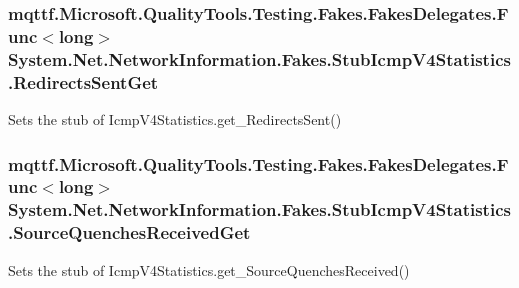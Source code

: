 \hypertarget{class_system_1_1_net_1_1_network_information_1_1_fakes_1_1_stub_icmp_v4_statistics_a3f2e2d6fbc433ec25dd63fc625761414}{
\subsubsection[{Redirects\-Sent\-Get}]{\setlength{\rightskip}{0pt plus 5cm}mqttf.\-Microsoft.\-Quality\-Tools.\-Testing.\-Fakes.\-Fakes\-Delegates.\-Func$<$long$>$ System.\-Net.\-Network\-Information.\-Fakes.\-Stub\-Icmp\-V4\-Statistics.\-Redirects\-Sent\-Get}}\label{class_system_1_1_net_1_1_network_information_1_1_fakes_1_1_stub_icmp_v4_statistics_a3f2e2d6fbc433ec25dd63fc625761414}


Sets the stub of Icmp\-V4\-Statistics.\-get\-\_\-\-Redirects\-Sent()

\hypertarget{class_system_1_1_net_1_1_network_information_1_1_fakes_1_1_stub_icmp_v4_statistics_a6512dd602667c99e7bd9515120ee40f1}{
\subsubsection[{Source\-Quenches\-Received\-Get}]{\setlength{\rightskip}{0pt plus 5cm}mqttf.\-Microsoft.\-Quality\-Tools.\-Testing.\-Fakes.\-Fakes\-Delegates.\-Func$<$long$>$ System.\-Net.\-Network\-Information.\-Fakes.\-Stub\-Icmp\-V4\-Statistics.\-Source\-Quenches\-Received\-Get}}\label{class_system_1_1_net_1_1_network_information_1_1_fakes_1_1_stub_icmp_v4_statistics_a6512dd602667c99e7bd9515120ee40f1}


Sets the stub of Icmp\-V4\-Statistics.\-get\-\_\-\-Source\-Quenches\-Received()

